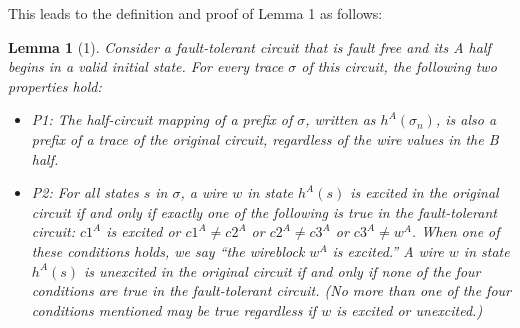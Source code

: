\documentclass[12pt]{report}
\newtheorem*{lemma}{Lemma}
\begin{document}
This leads to the definition and proof of Lemma 1 as follows:

\begin{lemma}[1]
Consider a fault-tolerant circuit that is fault free and its A half begins in a valid initial state.  For every trace $\sigma$ of this circuit, the following two properties hold: %
\begin{itemize}
\item P1: The half-circuit mapping of a prefix of $\sigma$, written as $h^{A}(\sigma_n)$, is also a prefix of a trace of the original circuit, regardless of the wire values in the B half.
\item P2: For all states $s$ in $\sigma$, a wire $w$ in state $h^A(s)$ is excited in the original circuit if and only if exactly one of the following is true in the fault-tolerant circuit: $c1^A$ is excited or $c1^{A}\neq c2^{A}$ or $c2^{A}\neq c3^A$ or $c3^{A}\neq w^A$.  When one of these conditions holds, we say “the wireblock $w^A$ is excited.”  A wire $w$ in state $h^A(s)$ is unexcited in the original circuit if and only if none of the four conditions are true in the fault-tolerant circuit.  (No more than one of the four conditions mentioned may be true regardless if $w$ is excited or unexcited.) 
\end{itemize}
 



\end{lemma}
\end{document}
